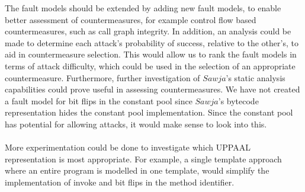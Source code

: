 The fault models should be extended by adding new fault models, to enable better assessment of countermeasures, for example control flow based countermeasures, such as call graph integrity. In addition, an analysis could be made to determine each attack's probability of success, relative to the other's, to aid in countermeasure selection. This would allow us to rank the fault models in terms of attack difficulty, which could be used in the selection of an appropriate countermeasure. Furthermore, further investigation of $Sawja$'s static analysis capabilities could prove useful in assessing countermeasures. We have not created a fault model for bit flips in the constant pool since $Sawja$'s bytecode representation hides the constant pool implementation. Since the constant pool has potential for allowing attacks, it would make sense to look into this.\\\\
More experimentation could be done to investigate which UPPAAL representation is most appropriate. For example, a single template approach where an entire program is modelled in one template, would simplify  the implementation of invoke and bit flips in the method identifier.
